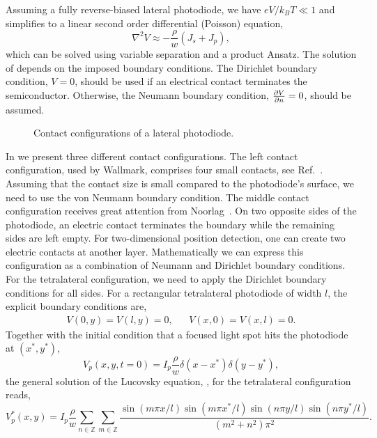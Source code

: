 Assuming a fully reverse-biased lateral photodiode, we have $eV/k_BT\ll1$ and  simplifies to a linear second order differential (Poisson) equation,
\begin{equation}
	\nabla^2V\approx-\frac{\rho}{w}\left(J_s+J_p\right)
	\label{eq:lucovsky_reverse_bias},
\end{equation}
which can be solved using variable separation and a product Ansatz.
The solution of  depends on the imposed boundary conditions.
The Dirichlet boundary condition, $V=0$, should be used if an electrical contact terminates the semiconductor. Otherwise, the Neumann boundary condition, $\pdv{V}{n}=0$, should be assumed.
\begin{figure}[H]
	\centering
	
	\caption{Contact configurations of a lateral photodiode.}\label{fig:lateral_photodiode_contacts}
\end{figure}
In  we present three different contact configurations.
The left contact configuration, used by Wallmark, comprises four small contacts, see Ref.~\cite{Wallmark57}.
Assuming that the contact size is small compared to the photodiode's surface, we need to use the von Neumann boundary condition.
The middle contact configuration receives great attention from Noorlag~\cite{Noorlag74}.
On two opposite sides of the photodiode, an electric contact terminates the boundary while the remaining sides are left empty.
For two-dimensional position detection, one can create two electric contacts at another layer.
Mathematically we can express this configuration as a combination of Neumann and Dirichlet boundary conditions.
For the tetralateral configuration, we need to apply the Dirichlet boundary conditions for all sides.
For a rectangular tetralateral photodiode of width $l$, the explicit boundary conditions are,
\begin{align}
	V(0, y)=V(l,y)=0, && V(x,0)=V(x,l)=0.
\end{align}
Together with the initial condition that a focused light spot hits the photodiode at $(x^*,y^*)$,
\begin{equation}
	V_p(x,y, t=0)=I_p\frac{\rho}{w}\delta(x-x^*)\delta(y-y^*)
	\label{eq:lucovsky_initial},
\end{equation}
the general solution of the Lucovsky equation, , for the tetralateral configuration reads,
\begin{equation}
	V^*_p(x,y)=I_p\frac{\rho}{w}\sum_{n\in\mathbb{Z}}\sum_{m\in\mathbb{Z}}\frac{\sin(m\pi x/l)\sin(m\pi x^*/l)\sin(n\pi y/l)\sin(n\pi y^*/l)}{(m^2+n^2)\pi^2}
	\label{eq:lucovsky_solution}.
\end{equation}
